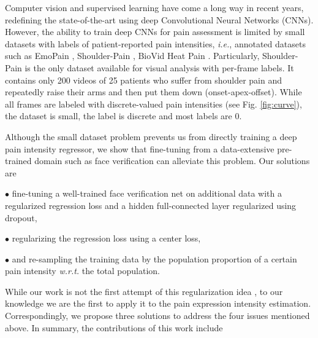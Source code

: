 \documentclass{article}
\begin{document}
Computer vision and supervised learning have come a long way in recent years, redefining the state-of-the-art using deep Convolutional Neural Networks (CNNs).
However, the ability to train deep CNNs for pain assessment is limited by small datasets with labels of patient-reported pain intensities, \emph{i.e.}, annotated datasets such as EmoPain \cite{aung2015automatic}, Shoulder-Pain \cite{lucey2011painful}, BioVid Heat Pain \cite{werner2013towards}.
Particularly, Shoulder-Pain is the only dataset available for visual analysis with per-frame labels.
It contains only 200 videos of 25 patients who suffer from shoulder pain and repeatedly raise their arms and then put them down (onset-apex-offset). 
While all frames are labeled with discrete-valued pain intensities (see Fig. \ref{fig:curve}), 
the dataset is small, the label is discrete and most labels are 0.




Although the small dataset problem prevents us from directly training a deep pain intensity regressor,
we show that fine-tuning from a data-extensive pre-trained domain such as face verification can alleviate this problem.
Our solutions are

\noindent $\bullet$ fine-tuning a well-trained face verification net on additional data with a regularized regression loss and a hidden full-connected layer regularized using dropout,

\noindent $\bullet$ regularizing the regression loss using a center loss,

\noindent $\bullet$ and re-sampling the training data by the population proportion of a certain pain intensity \emph{w.r.t.} the total population.


While our work is not the first attempt of this regularization idea \cite{ding2016facenet2expnet}, to our knowledge we are the first to apply it to the pain expression intensity estimation. Correspondingly, we propose three solutions to address the four issues mentioned above. In summary, the contributions of this work include
\end{document}
